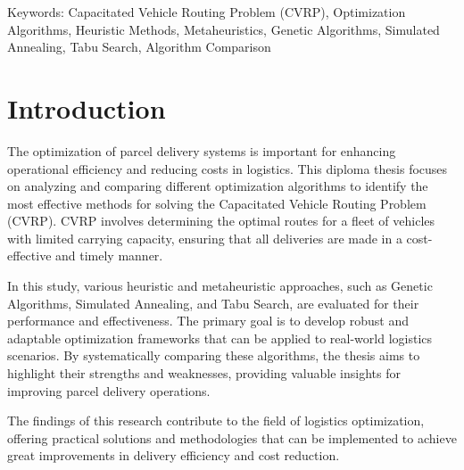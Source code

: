 \documentclass{article}
\begin{document}
    Keywords: Capacitated Vehicle Routing Problem (CVRP), Optimization Algorithms, Heuristic Methods, Metaheuristics, Genetic Algorithms, Simulated Annealing, Tabu Search, Algorithm Comparison

    \newpage


    \tableofcontents
    \cleardoublepage

    \newpage


    \section{Introduction}

    The optimization of parcel delivery systems is important for enhancing operational efficiency and reducing costs in logistics.
    This diploma thesis focuses on analyzing and comparing different optimization algorithms to identify the most effective methods for solving the Capacitated Vehicle Routing Problem (CVRP).
    CVRP involves determining the optimal routes for a fleet of vehicles with limited carrying capacity, ensuring that all deliveries are made in a cost-effective and timely manner.

    In this study, various heuristic and metaheuristic approaches, such as Genetic Algorithms, Simulated Annealing, and Tabu Search, are evaluated for their performance and effectiveness.
    The primary goal is to develop robust and adaptable optimization frameworks that can be applied to real-world logistics scenarios. By systematically comparing these algorithms, the thesis aims to highlight their strengths and weaknesses, providing valuable insights for improving parcel delivery operations.

    The findings of this research contribute to the field of logistics optimization, offering practical solutions and methodologies that can be implemented to achieve great improvements in delivery efficiency and cost reduction.
\end{document}

